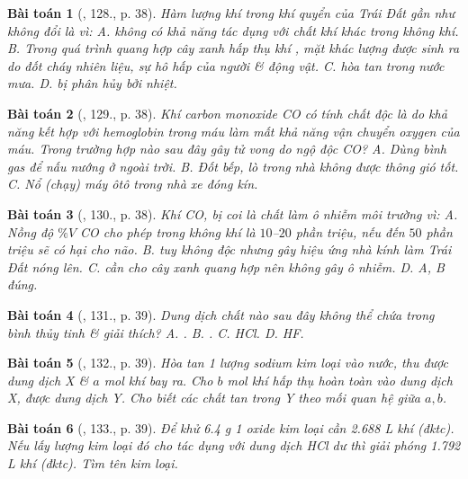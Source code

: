 \documentclass{article}
\newtheorem{baitoan}{Bài toán}
\begin{document}
\begin{baitoan}[\cite{An_400_BT_Hoa_Hoc_9}, 128., p. 38]
	Hàm lượng khí {\rm{}} trong khí quyển của Trái Đất gần như không đổi là vì: {\sf A.} {\rm{}} không có khả năng tác dụng với chất khí khác trong không khí. {\sf B.} Trong quá trình quang hợp cây xanh hấp thụ khí {\rm{}}, mặt khác lượng {\rm{}} được sinh ra do đốt cháy nhiên liệu, sự hô hấp của người \& động vật. {\sf C.} {\rm{}} hòa tan trong nước mưa. {\sf D.} {\rm{}} bị phân hủy bởi nhiệt.
\end{baitoan}

\begin{baitoan}[\cite{An_400_BT_Hoa_Hoc_9}, 129., p. 38]
	Khí carbon monoxide {\rm CO} có tính chất độc là do khả năng kết hợp với hemoglobin trong máu làm mất khả năng vận chuyển oxygen của máu. Trong trường hợp nào sau đây gây tử vong do ngộ độc {\rm CO}? {\sf A.} Dùng bình gas để nấu nướng ở ngoài trời. {\sf B.} Đốt bếp, lò trong nhà không được thông gió tốt. {\sf C.} Nổ (chạy) máy ôtô trong nhà xe đóng kín.
\end{baitoan}

\begin{baitoan}[\cite{An_400_BT_Hoa_Hoc_9}, 130., p. 38]
	Khí {\rm CO, } bị coi là chất làm ô nhiễm môi trường vì: {\sf A.} Nồng độ $\%V$ {\rm CO} cho phép trong không khí là $10$--$20$ phần triệu, nếu đến $50$ phần triệu sẽ có hại cho não. {\sf B.} {\rm{}} tuy không độc nhưng gây hiệu ứng nhà kính làm Trái Đất nóng lên. {\sf C.} {\rm{}}  cần cho cây xanh quang hợp nên không gây ô nhiễm. {\sf D. A, B} đúng.
\end{baitoan}

\begin{baitoan}[\cite{An_400_BT_Hoa_Hoc_9}, 131., p. 39]
	Dung dịch chất nào sau đây không thể chứa trong bình thủy tinh \& giải thích? {\sf A.} {\rm{}}. {\sf B.} {\rm{}}. {\sf C.} {\rm HCl}. {\sf D.} {\rm HF}.
\end{baitoan}

\begin{baitoan}[\cite{An_400_BT_Hoa_Hoc_9}, 132., p. 39]
	Hòa tan 1 lượng sodium kim loại vào nước, thu được dung dịch X \& $a$ mol khí bay ra. Cho $b$ mol khí {\rm{}} hấp thụ hoàn toàn vào dung dịch X, được dung dịch Y. Cho biết các chất tan trong Y theo mối quan hệ giữa $a,b$.
\end{baitoan}

\begin{baitoan}[\cite{An_400_BT_Hoa_Hoc_9}, 133., p. 39]
	Để khử {\rm6.4 g} 1 oxide kim loại cần {\rm2.688 L} khí {\rm{}} (đktc). Nếu lấy lượng kim loại đó cho tác dụng với dung dịch {\rm HCl} dư thì giải phóng {\rm1.792 L} khí {\rm{}} (đktc). Tìm tên kim loại.
\end{baitoan}
\end{document}
